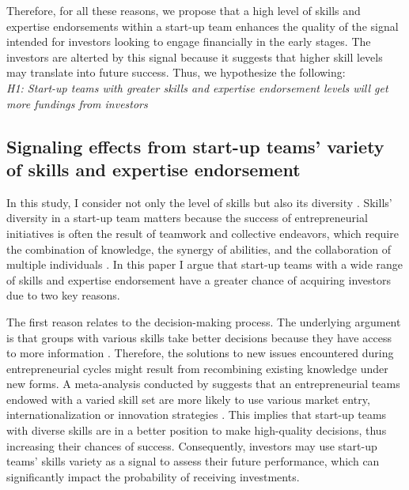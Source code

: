 \documentclass[12pt]{article}
\begin{document}
Therefore, for all these reasons, we propose that a high level of skills and expertise endorsements within a start-up team enhances the quality of the signal intended for investors looking to engage financially in the early stages. The investors are alterted by this signal because it suggests that higher skill levels may translate into future success. Thus, we hypothesize the following: \\

\noindent \textit{H1: Start-up teams with greater skills and expertise endorsement levels will get more fundings from investors}

\subsection{Signaling effects from start-up teams' variety of skills and expertise endorsement}


In this study, I consider not only the level of skills but also its diversity \citep{harrison2007s}. Skills' diversity in a start-up team matters because the success of entrepreneurial initiatives is often the result of teamwork and collective endeavors, which require the combination of knowledge, the synergy of abilities, and the collaboration of multiple individuals \citep{klotz2014new}. In this paper I argue that start-up teams with a wide range of skills and expertise endorsement have a greater chance of acquiring investors due to two key reasons.

The first reason relates to the decision-making process. The underlying argument is that groups with various skills take better decisions because they have access to more information \citep{hong2001problem}. Therefore, the solutions to new issues encountered during entrepreneurial cycles might result from recombining existing knowledge under new forms. A meta-analysis conducted by \citet{jin2017entrepreneurial} suggests that an entrepreneurial teams endowed with a varied skill set are more likely to use various market entry, internationalization or innovation strategies \citep{boeker1989strategic}. This implies that start-up teams with diverse skills are in a better position to make high-quality decisions, thus increasing their chances of success. Consequently, investors may use start-up teams' skills variety as a signal to assess their future performance, which can significantly impact the probability of receiving investments.
\end{document}
